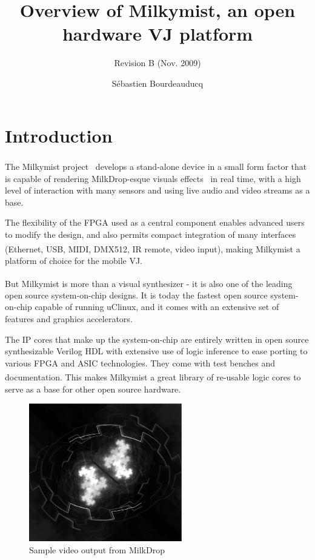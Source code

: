 \documentclass[a4paper,11pt,twocolumn]{paper}
\title{Overview of Milkymist, an open hardware VJ platform}
\subtitle{Revision B (Nov. 2009)}
\author{S\'ebastien Bourdeauducq}
\begin{document}
\maketitle{}
\section{Introduction}
The Milkymist\textsuperscript{\texttrademark} project~\cite{milkymist} develops a stand-alone device in a small form factor that is capable of rendering MilkDrop-esque visuals effects~\cite{milkdrop} in real time, with a high level of interaction with many sensors and using live audio and video streams as a base.

The flexibility of the FPGA used as a central component enables advanced users to modify the design, and also permits compact integration of many interfaces (Ethernet, USB, MIDI, DMX512, IR remote, video input), making Milkymist\textsuperscript{\texttrademark} a platform of choice for the mobile VJ.

But Milkymist\textsuperscript{\texttrademark} is more than a visual synthesizer - it is also one of the leading open source system-on-chip designs. It is today the fastest open source system-on-chip capable of running uClinux, and it comes with an extensive set of features and graphics accelerators.

The IP cores that make up the system-on-chip are entirely written in open source synthesizable Verilog HDL with extensive use of logic inference to ease porting to various FPGA and ASIC technologies. They come with test benches and documentation. This makes Milkymist\textsuperscript{\texttrademark} a great library of re-usable logic cores to serve as a base for other open source hardware.

\begin{figure}
\centering
\includegraphics[height=60mm]{milkdrop_bw.eps}
\caption{Sample video output from MilkDrop}
\label{fig:genodefx}
\end{figure}
\end{document}
